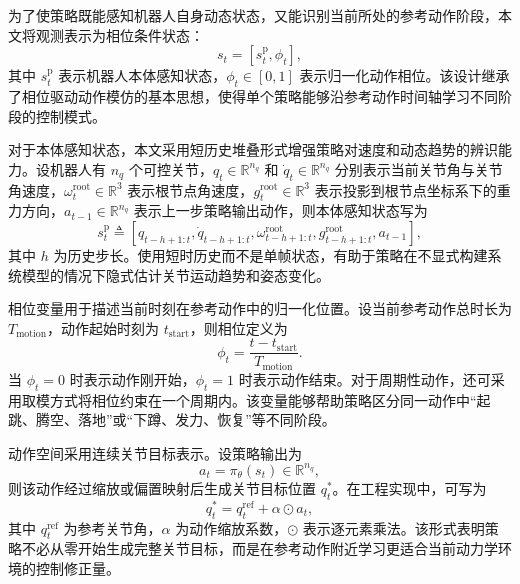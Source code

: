 为了使策略既能感知机器人自身动态状态，又能识别当前所处的参考动作阶段，本文将观测表示为相位条件状态：
\begin{equation}
s_t=
\left[
s_t^{\mathrm{p}},\phi_t
\right],
\label{eq:state_full}
\end{equation}
其中 $s_t^{\mathrm{p}}$ 表示机器人本体感知状态，$\phi_t\in[0,1]$ 表示归一化动作相位。该设计继承了相位驱动动作模仿的基本思想\cite{deepmimic2018}，使得单个策略能够沿参考动作时间轴学习不同阶段的控制模式。

对于本体感知状态，本文采用短历史堆叠形式增强策略对速度和动态趋势的辨识能力。设机器人有 $n_q$ 个可控关节，$q_t\in\mathbb{R}^{n_q}$ 和 $\dot{q}_t\in\mathbb{R}^{n_q}$ 分别表示当前关节角与关节角速度，$\omega_t^{\mathrm{root}}\in\mathbb{R}^{3}$ 表示根节点角速度，$g_t^{\mathrm{root}}\in\mathbb{R}^{3}$ 表示投影到根节点坐标系下的重力方向，$a_{t-1}\in\mathbb{R}^{n_q}$ 表示上一步策略输出动作，则本体感知状态写为
\begin{equation}
s_t^{\mathrm{p}}
\triangleq
\left[
q_{t-h+1:t},
\dot{q}_{t-h+1:t},
\omega_{t-h+1:t}^{\mathrm{root}},
g_{t-h+1:t}^{\mathrm{root}},
a_{t-1}
\right],
\label{eq:prop_state}
\end{equation}
其中 $h$ 为历史步长。使用短时历史而不是单帧状态，有助于策略在不显式构建系统模型的情况下隐式估计关节运动趋势和姿态变化。

相位变量用于描述当前时刻在参考动作中的归一化位置。设当前参考动作总时长为 $T_{\mathrm{motion}}$，动作起始时刻为 $t_{\mathrm{start}}$，则相位定义为
\begin{equation}
\phi_t
=
\frac{t-t_{\mathrm{start}}}{T_{\mathrm{motion}}}.
\label{eq:phase_var}
\end{equation}
当 $\phi_t=0$ 时表示动作刚开始，$\phi_t=1$ 时表示动作结束。对于周期性动作，还可采用取模方式将相位约束在一个周期内。该变量能够帮助策略区分同一动作中“起跳、腾空、落地”或“下蹲、发力、恢复”等不同阶段。

动作空间采用连续关节目标表示。设策略输出为
\begin{equation}
a_t=\pi_{\theta}(s_t)\in\mathbb{R}^{n_q},
\end{equation}
则该动作经过缩放或偏置映射后生成关节目标位置 $q_t^{\ast}$。在工程实现中，可写为
\begin{equation}
q_t^{\ast}
=
q^{\mathrm{ref}}_t+\alpha\odot a_t,
\label{eq:action_to_target}
\end{equation}
其中 $q^{\mathrm{ref}}_t$ 为参考关节角，$\alpha$ 为动作缩放系数，$\odot$ 表示逐元素乘法。该形式表明策略不必从零开始生成完整关节目标，而是在参考动作附近学习更适合当前动力学环境的控制修正量。

